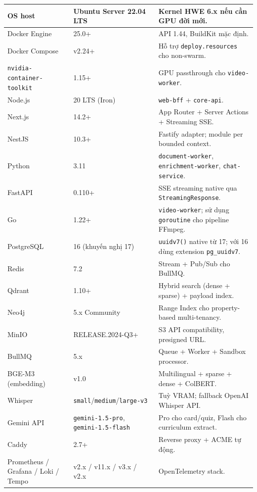 \begin{longtable}{|p{4.3cm}|p{3.7cm}|p{5.5cm}|}
OS host & Ubuntu Server 22.04 LTS & Kernel HWE 6.x nếu cần GPU đời
    mới. \\
\hline
Docker Engine & 25.0+ & API 1.44, BuildKit mặc định. \\
\hline
Docker Compose & v2.24+ & Hỗ trợ \texttt{deploy.resources} cho
    non-swarm. \\
\hline
\texttt{nvidia-container-toolkit} & 1.15+ & GPU passthrough cho
    \texttt{video-worker}. \\
\hline
Node.js & 20 LTS (Iron) & \texttt{web-bff} + \texttt{core-api}. \\
\hline
Next.js & 14.2+ & App Router + Server Actions + Streaming SSE. \\
\hline
NestJS & 10.3+ & Fastify adapter; module per bounded context. \\
\hline
Python & 3.11 & \texttt{document-worker},
    \texttt{enrichment-worker}, \texttt{chat-service}. \\
\hline
FastAPI & 0.110+ & SSE streaming native qua
    \texttt{StreamingResponse}. \\
\hline
Go & 1.22+ & \texttt{video-worker}; sử dụng \texttt{goroutine} cho
    pipeline FFmpeg. \\
\hline
PostgreSQL & 16 (khuyến nghị 17) & \texttt{uuidv7()} native từ 17;
    với 16 dùng extension \texttt{pg\_uuidv7}. \\
\hline
Redis & 7.2 & Stream + Pub/Sub cho BullMQ. \\
\hline
Qdrant & 1.10+ & Hybrid search (dense + sparse) + payload index. \\
\hline
Neo4j & 5.x Community & Range Index cho property-based
    multi-tenancy. \\
\hline
MinIO & RELEASE.2024-Q3+ & S3 API compatibility, presigned URL. \\
\hline
BullMQ & 5.x & Queue + Worker + Sandbox processor. \\
\hline
BGE-M3 (embedding) & v1.0 & Multilingual + sparse + dense + ColBERT. \\
\hline
Whisper & \texttt{small}/\texttt{medium}/\texttt{large-v3} & Tuỳ
    VRAM; fallback OpenAI Whisper API. \\
\hline
Gemini API & \texttt{gemini-1.5-pro},
    \texttt{gemini-1.5-flash} & Pro cho card/quiz, Flash cho
    curriculum extract. \\
\hline
Caddy & 2.7+ & Reverse proxy + ACME tự động. \\
\hline
Prometheus / Grafana / Loki / Tempo
    & v2.x / v11.x / v3.x / v2.x & OpenTelemetry stack. \\
\hline
\end{longtable}

